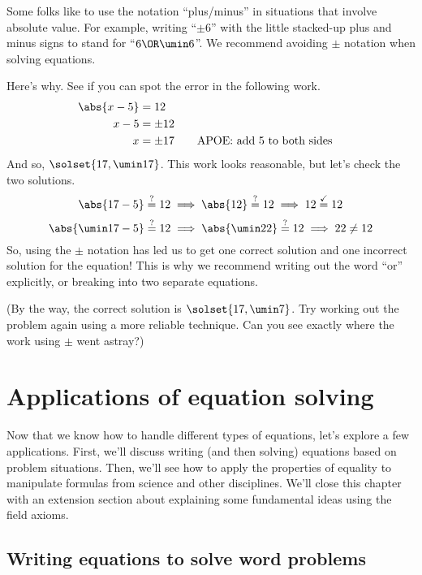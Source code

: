 \begin{boxwarn}
Some folks like to use the notation ``plus/minus'' in situations that involve absolute value. For example, writing ``$\pm6$'' with the little stacked-up plus and minus signs to stand for ``$6 \OR \umin6$''. We recommend avoiding $\pm$ notation when solving equations.

Here's why. See if you can spot the error in the following work.
\[\begin{aligned}
\abs{x - 5} &= 12\\
x-5 &= \pm12\\
x &= \pm17
&& \text{\quad APOE: add 5 to both sides}\\
\end{aligned}\]
And so, $\solset{17, \umin17}$. This work looks reasonable, but let's check the two solutions.
\[\abs{17 - 5} \overset{?}{=} 12 \implies \abs{12} \overset{?}{=} 12 \implies 12 \overset{\checkmark}{=} 12\]
\[\abs{\umin17 - 5} \overset{?}{=} 12 \implies \abs{\umin22} \overset{?}{=} 12 \implies 22 \neq 12\]
So, using the $\pm$ notation has led us to get one correct solution and one incorrect solution for the equation! This is why we recommend writing out the word ``or'' explicitly, or breaking into two separate equations.

(By the way, the correct solution is $\solset{17, \umin7}$. Try working out the problem again using a more reliable technique. Can you see exactly where the work using $\pm$ went astray?)
\end{boxwarn}

\section{Applications of equation solving}
\label{sec:eqsolveapplications}

Now that we know how to handle different types of equations, let's explore a few applications. First, we'll discuss writing (and then solving) equations based on problem situations. Then, we'll see how to apply the properties of equality to manipulate formulas from science and other disciplines. We'll close this chapter with an extension section about explaining some fundamental ideas using the field axioms.

\subsection{Writing equations to solve word problems}

